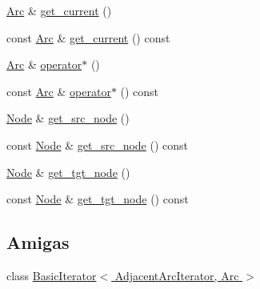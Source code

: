 \begin{DoxyCompactItemize}
\item 
\hyperlink{class_designar_1_1_digraph_a0ceb278671f2a535c00fddccdeafd69f}{Arc} \& \hyperlink{class_designar_1_1_digraph_1_1_adjacent_arc_iterator_abd6687753cb547318760e8f3b87922e2}{get\+\_\+current} ()
\item 
const \hyperlink{class_designar_1_1_digraph_a0ceb278671f2a535c00fddccdeafd69f}{Arc} \& \hyperlink{class_designar_1_1_digraph_1_1_adjacent_arc_iterator_ac388275a16db45fc754a193766c215ce}{get\+\_\+current} () const
\item 
\hyperlink{class_designar_1_1_digraph_a0ceb278671f2a535c00fddccdeafd69f}{Arc} \& \hyperlink{class_designar_1_1_digraph_1_1_adjacent_arc_iterator_a2a1ee85a8076e07fd99d35676ec69887}{operator$\ast$} ()
\item 
const \hyperlink{class_designar_1_1_digraph_a0ceb278671f2a535c00fddccdeafd69f}{Arc} \& \hyperlink{class_designar_1_1_digraph_1_1_adjacent_arc_iterator_aaf54c97702c3b6e3ccf419c2f7966e44}{operator$\ast$} () const
\item 
\hyperlink{class_designar_1_1_digraph_a4dc921c41a480b7946a04170e997d8ae}{Node} \& \hyperlink{class_designar_1_1_digraph_1_1_adjacent_arc_iterator_a72e125198f4cea2ab0ac1213c1cbc1e4}{get\+\_\+src\+\_\+node} ()
\item 
const \hyperlink{class_designar_1_1_digraph_a4dc921c41a480b7946a04170e997d8ae}{Node} \& \hyperlink{class_designar_1_1_digraph_1_1_adjacent_arc_iterator_a09c51f5124610cd6e5360dc7039b4639}{get\+\_\+src\+\_\+node} () const
\item 
\hyperlink{class_designar_1_1_digraph_a4dc921c41a480b7946a04170e997d8ae}{Node} \& \hyperlink{class_designar_1_1_digraph_1_1_adjacent_arc_iterator_ad1df4c6624e411ea5ec10ee3d1414b1c}{get\+\_\+tgt\+\_\+node} ()
\item 
const \hyperlink{class_designar_1_1_digraph_a4dc921c41a480b7946a04170e997d8ae}{Node} \& \hyperlink{class_designar_1_1_digraph_1_1_adjacent_arc_iterator_a3b5e320227b6456e9b0de9d505e0eae4}{get\+\_\+tgt\+\_\+node} () const
\end{DoxyCompactItemize}
\subsection*{Amigas}
\begin{DoxyCompactItemize}
\item 
class \hyperlink{class_designar_1_1_digraph_1_1_adjacent_arc_iterator_a73ad70d76f3331ee4b07451db1347918}{Basic\+Iterator$<$ Adjacent\+Arc\+Iterator, Arc $>$}
\end{DoxyCompactItemize}
